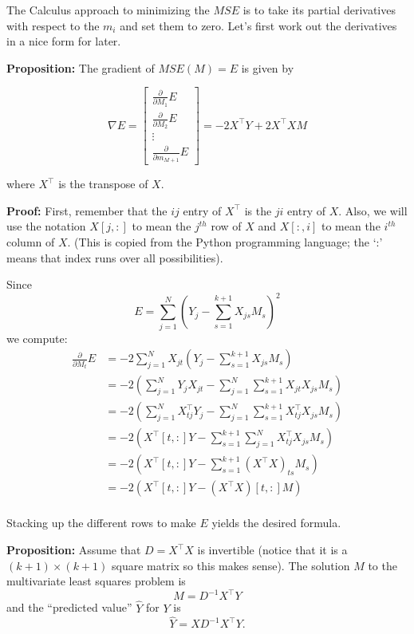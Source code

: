 \documentclass[
  oneside]{scrbook}
\newcommand{\df}[1]{\frac{\partial}{\partial #1}}
\begin{document}
The Calculus approach to minimizing the \(MSE\) is to take its partial
derivatives with respect to the \(m_{i}\) and set them to zero. Let's
first work out the derivatives in a nice form for later.

\textbf{Proposition:} The gradient of \(MSE(M)=E\) is given by

\begin{equation} \nabla E = \left[\begin{matrix} \df{M_1}E \\ \df{M_2}E \\ \vdots \\
\df{m_{M+1}}E\end{matrix}\right] = -2 X^{\intercal}Y + 2
X^{\intercal}XM \label{eq:gradient}\end{equation}

where \(X^{\intercal}\) is the transpose of \(X\).

\textbf{Proof:} First, remember that the \(ij\) entry of
\(X^{\intercal}\) is the \(ji\) entry of \(X\). Also, we will use the
notation \(X[j,:]\) to mean the \(j^{th}\) row of \(X\) and \(X[:,i]\)
to mean the \(i^{th}\) column of \(X\). (This is copied from the Python
programming language; the `:' means that index runs over all
possibilities).

Since \[ E = \sum_{j=1}^{N} (Y_j-\sum_{s=1}^{k+1} X_{js}M_{s})^2 \] we
compute: \begin{equation}\begin{aligned} \df{M_t}E &= -2\sum_{j=1}^{N}
X_{jt}(Y_{j}-\sum_{s=1}^{k+1} X_{js}M_{s}) \\ &= -2(\sum_{j=1}^{N}
Y_{j}X_{jt} - \sum_{j=1}^{N}\sum_{s=1}^{k+1} X_{jt}X_{js}M_{s}) \\ &=
-2(\sum_{j=1}^{N} X^{\intercal}_{tj}Y_{j}
-\sum_{j=1}^{N}\sum_{s=1}^{k+1} X^{\intercal}_{tj}X_{js}M_{s}) \\ &=
-2(X^{\intercal}[t,:]Y - \sum_{s=1}^{k+1}\sum_{j=1}^{N}
X^{\intercal}_{tj}X_{js}M_{s}) \\ &= -2(X^{\intercal}[t,:]Y -
\sum_{s=1}^{k+1} (X^{\intercal}X)_{ts}M_{s}) \\ &=
-2(X^{\intercal}[t,:]Y - (X^{\intercal}X)[t,:]M)\\
\end{aligned}\label{eq:gradient2}\end{equation}

Stacking up the different rows to make \(E\) yields the desired formula.

\textbf{Proposition:} Assume that \(D=X^{\intercal}X\) is invertible
(notice that it is a \((k+1)\times(k+1)\) square matrix so this makes
sense). The solution \(M\) to the multivariate least squares problem is
\begin{equation} M =
D^{-1}X^{\intercal}Y \label{eq:Msolution}\end{equation} and the
``predicted value'' \(\hat{Y}\) for \(Y\) is
\begin{equation} \hat{Y} = XD^{-1}X^{\intercal}Y.
\label{eq:projection}\end{equation}
\end{document}
